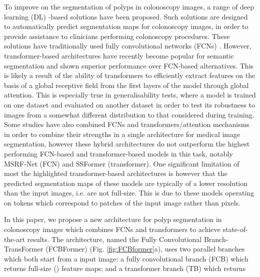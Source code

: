 \documentclass[runningheads]{llncs}
\begin{document}
To improve on the segmentation of polyps in colonoscopy images, a range of deep learning (DL) -based solutions \cite{resunet++,pranet,colonsegnet,ddanet,uacanet,hardnet,transfuse,caranet,msrfnet,ssformer} have been proposed. Such solutions are designed to automatically predict segmentation maps for colonoscopy images, in order to provide assistance to clinicians performing colonoscopy procedures. These solutions have traditionally used fully convolutional networks (FCNs) \cite{unet,unet++,resunet++,guo1,guo2,doubleunet,guo3,colonsegnet,hardnet,msrfnet}. However, transformer-based architectures \cite{dpt,segformer,pvt,pvtv2,ssformer} have recently become popular for semantic segmentation and shown superior performance over FCN-based alternatives. This is likely a result of the ability of transformers to efficiently extract features on the basis of a global receptive field from the first layers of the model through global attention. This is especially true in generalisability tests, where a model is trained on one dataset and evaluated on another dataset in order to test its robustness to images from a somewhat different distribution to that considered during training. Some studies have also combined FCNs and transformers/attention mechanisms \cite{pranet,ddanet,uacanet,transunet,transfuse,caranet} in order to combine their strengths in a single architecture for medical image segmentation, however these hybrid architectures do not outperform the highest performing FCN-based and transformer-based models in this task, notably MSRF-Net \cite{msrfnet} (FCN) and SSFormer \cite{ssformer} (transformer). One significant limitation of most the highlighted transformer-based architectures is however that the predicted segmentation maps of these models are typically of a lower resolution than the input images, i.e. are not full-size. This is due to these models operating on tokens which correspond to patches of the input image rather than pixels.

In this paper, we propose a new architecture for polyp segmentation in colonoscopy images which combines FCNs and transformers to achieve state-of-the-art results. The architecture, named the Fully Convolutional Branch-TransFormer (FCBFormer) (Fig. \ref{fig:FCBformer}a), uses two parallel branches which both start from a  input image: a fully convolutional branch (FCB) which returns full-size () feature maps; and a transformer branch (TB) which returns  \par
\end{document}
